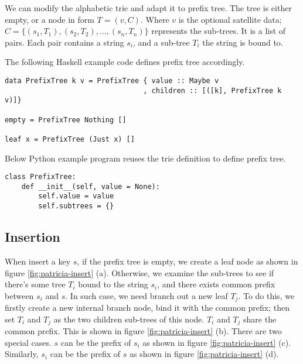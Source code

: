 \documentclass{article}
\begin{document}
We can modify the alphabetic trie and adapt it
to prefix tree. The tree is either empty, or a node in form $T = (v, C)$.
Where $v$ is the optional satellite data; $C = \{(s_1, T_1), (s_2, T_2), ..., (s_n, T_n)\}$ represents the sub-trees. It is a list of pairs. Each pair contains
a string $s_i$, and a sub-tree $T_i$ the string is bound to.

The following Haskell example code defines prefix tree accordingly.

\lstset{language=Haskell}
\begin{lstlisting}
data PrefixTree k v = PrefixTree { value :: Maybe v
                                 , children :: [([k], PrefixTree k v)]}

empty = PrefixTree Nothing []

leaf x = PrefixTree (Just x) []
\end{lstlisting}

Below Python example program reuses the trie definition to define prefix tree.

\lstset{language=Python}
\begin{lstlisting}
class PrefixTree:
    def __init__(self, value = None):
        self.value = value
        self.subtrees = {}
\end{lstlisting}

\subsection{Insertion}

When insert a key $s$, if the prefix tree is empty, we
create a leaf node as shown in figure \ref{fig:patricia-insert} (a).
Otherwise, we examine the sub-trees to see if
there's some tree $T_i$ bound to the string $s_i$,
and there exists common prefix between $s_i$ and $s$. In such case, we
need branch out a new leaf $T_j$. To do this, we firstly
create a new internal branch node, bind it with the common
prefix; then set $T_i$ and $T_j$ as the two children sub-trees of this node.
$T_i$ and $T_j$ share the common
prefix. This is shown in figure \ref{fig:patricia-insert} (b).
There are two special cases. $s$ can be the prefix of $s_i$
as shown in figure \ref{fig:patricia-insert} (c). Similarly,
$s_i$ can be the prefix of $s$ as shown in figure \ref{fig:patricia-insert} (d).
\end{document}
